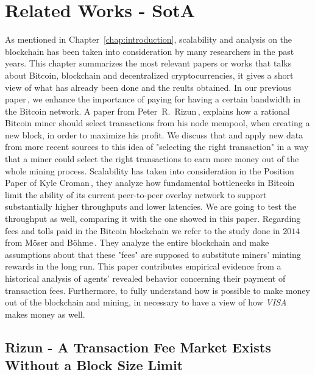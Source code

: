 \documentclass[USenglish]{uit-thesis}
\begin{document}
\chapter{Related Works - SotA}
\label{chap:prev_works}
As mentioned in Chapter~\ref{chap:introduction},
scalability and analysis on the blockchain has been taken into consideration
by many researchers in the past years.
This chapter summarizes the most relevant papers or
works that talks about Bitcoin,
blockchain and decentralized cryptocurrencies,
it gives a short view of what has already been done and
the reults obtained.
In our previous paper\,\cite{Tedeschi:2016:PBB}, we enhance
the importance of paying for having a certain
bandwidth in the Bitcoin network.
A paper
from Peter~R.~Rizun\,\cite{Rizun:2015:blocksizelimit},
explains how a rational Bitcoin
miner should select transactions from his node mempool,
when creating a new block,
in order to maximize his profit. We discuss that and apply
new data from more recent sources to this idea of
"selecting the right transaction" in a way that a miner could
select the right transactions to earn more money out of the whole
mining process.
Scalability has taken into consideration
in the Position Paper of Kyle Croman\,\cite{croman2016}, they
analyze how fundamental bottlenecks in Bitcoin limit the ability
of its current peer-to-peer
overlay network to support substantially higher
throughputs and lower latencies. We are
going to test the throughput as well, comparing it with the one
showed in this paper.
Regarding fees and tolls paid in the Bitcoin blockchain
we refer to the study done in $2014$ from Möser and
Böhme\,\cite{Moser2015}. They analyze the
entire blockchain and make assumptions about
that these "fees" are supposed to substitute miners'
minting rewards in the long run. This paper
contributes empirical evidence from a historical
analysis of agents' revealed behavior concerning
their payment of transaction fees.
Furthermore, to fully understand how is possible
to make money out of the blockchain and mining,
in necessary to have a view of
how \emph{VISA}\,\cite{visa} makes money as well.

\section{Rizun - A Transaction Fee Market Exists Without a Block Size Limit}
\label{sec:rizun}
\end{document}
